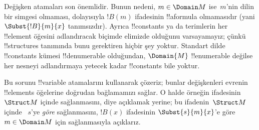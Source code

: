 \begin{explain}
Değişken atamaları son
 önemlidir. Bunun nedeni,
$m \in \Domain M$ ise~$m$'nin dilin bir simgesi olmaması, dolayısıyla
$!B(m)$ ifadesinin !!a{formula} olmamasıdır (yani
$\Subst{!B}{m}{x}$ tanımsızdır). Ayrıca !!{constant}s ya da terimlerin
her !!{element} öğesini adlandıracak biçimde elimizde olduğunu
varsayamayız; çünkü !!{structure}s tanımında bunu gerektiren hiçbir şey
yoktur. Standart dilde !!{constant}s kümesi !!{denumerable} olduğundan,
$\Domain{M}$ !!{enumerable} değilse her nesneyi adlandırmaya yetecek
kadar !!{constant}s bile yoktur.

Bu sorunu !!{variable} atamalarını kullanarak çözeriz; bunlar
değişkenleri evrenin !!{element}s öğelerine doğrudan bağlamamızı sağlar.
O halde örneğin
 ifadesinin
~$\Struct M$ içinde sağlanmasını,  diye açıklamak yerine; bu ifadenin~$\Struct M$ içinde
~$s$'ye \emph{göre} sağlanmasını, $!B(x)$ ifadesinin
$\Subst{s}{m}{x}$'e göre 
$m \in \Domain M$ için sağlanmasıyla açıklarız.
\end{explain}


